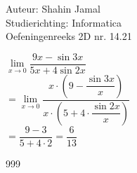 \documentclass[a4paper]{article}
\begin{document}
  
\noindent \large Auteur: Shahin Jamal \\
\noindent \large Studierichting: Informatica\\
\noindent \large Oefeningenreeks 2D nr. 14.21\\

\medskip

\normalsize

$\lim\limits_{x \rightarrow 0} \dfrac{9x-\sin3x}{5x+4\sin2x}$\\

$= \lim\limits_{x \rightarrow 0} \dfrac{x \cdot \left(9-\dfrac{\sin3x}{x}\right)}{x \cdot \left(5+4\cdot\dfrac{\sin2x}{x}\right)}$\\ 
 
$= \dfrac{9 - 3}{5 + 4 \cdot 2} = \dfrac{6}{13}$\\

\begin{thebibliography}{999}
\end{thebibliography}
\end{document}
